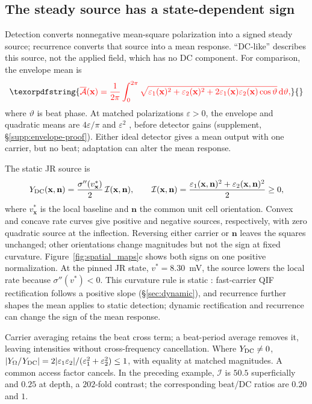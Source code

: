 \documentclass[11pt,a4paper]{article}
\newcommand{\Sig}{\sigma}
\providecommand{\DIFaddtex}[1]{{\protect\color{blue} \sf #1}} %
\providecommand{\DIFdeltex}[1]{{\protect\color{red} \scriptsize #1}} %
\providecommand{\DIFaddbegin}{} %
\providecommand{\DIFaddend}{} %
\providecommand{\DIFdelbegin}{} %
\providecommand{\DIFdelend}{} %
\providecommand{\DIFadd}[1]{\texorpdfstring{\DIFaddtex{#1}}{#1}} %
\providecommand{\DIFdel}[1]{\texorpdfstring{\DIFdeltex{#1}}{}} %
\begin{document}
\subsection{The steady source has a state-dependent sign}\label{sec:dc}
Detection converts nonnegative mean-square polarization into a signed steady
source; recurrence converts that source into a mean response. ``DC-like''
describes this source, not the applied field, which has no DC component.
\DIFdelbegin \DIFdel{For comparison, the envelope mean is
}\[
\DIFdel{\overline{\mathcal A}(\mathbf x)=\frac{1}{2\pi}\int_0^{2\pi}
\sqrt{\varepsilon_1(\mathbf x)^2+\varepsilon_2(\mathbf x)^2
+2\varepsilon_1(\mathbf x)\varepsilon_2(\mathbf x)\cos\vartheta}\,\mathrm d\vartheta,
}\]%
\DIFdel{where $\vartheta$ is beat phase. }\DIFdelend At matched polarizations $\varepsilon>0$,
the envelope and quadratic means are $4\varepsilon/\pi$ and
$\varepsilon^2$ \DIFdelbegin \DIFdel{, }\DIFdelend before detector gains \DIFaddbegin \DIFadd{(supplement, \S\ref{supp:envelope-proof})}\DIFaddend . Either ideal detector gives a mean
output with one carrier, but no beat; adaptation can alter the mean response.

The static JR source is
\[
Y_{\rm DC}(\mathbf x,\mathbf n)
=\frac{\Sig''(v^*_{\mathbf x})}{2}\,\mathcal I(\mathbf x,\mathbf n),
\qquad
\mathcal I(\mathbf x,\mathbf n)
=\frac{\varepsilon_1(\mathbf x,\mathbf n)^2+
\varepsilon_2(\mathbf x,\mathbf n)^2}{2}\ge0,
\]
where $v^*_{\mathbf x}$ is the local baseline and $\mathbf n$ the common
unit cell orientation. Convex and concave rate curves give positive and
negative sources, respectively, with zero quadratic source at the inflection.
Reversing either carrier or $\mathbf n$ leaves the squares unchanged;
other orientations change magnitudes but not the sign at fixed curvature.
Figure~\ref{fig:spatial_maps}c shows both signs on one positive normalization.
At the pinned JR state, $v^*=8.30$~mV, the source lowers the local rate
because $\Sig''(v^*)<0$.
This curvature rule \DIFdelbegin \DIFdel{is static : fast-carrier QIF rectification follows a
positive slope (\S\ref{sec:dynamic}), and
recurrence further shapes the mean}\DIFdelend \DIFaddbegin \DIFadd{applies to static detection; dynamic rectification and
recurrence can change the sign of the mean response}\DIFaddend .

Carrier averaging retains the beat cross term; a beat-period average removes
it, leaving intensities without cross-frequency cancellation. Where
$Y_{\rm DC}\ne0$,
$|Y_\Omega/Y_{\rm DC}|=2|\varepsilon_1\varepsilon_2|/
(\varepsilon_1^2+\varepsilon_2^2)\le1$, with equality at matched magnitudes.
A common access factor cancels. In the preceding example, $\mathcal I$ is
$50.5$ superficially and $0.25$ at depth, a $202$-fold contrast;
the corresponding beat/DC ratios are $0.20$ and $1$.
\end{document}
